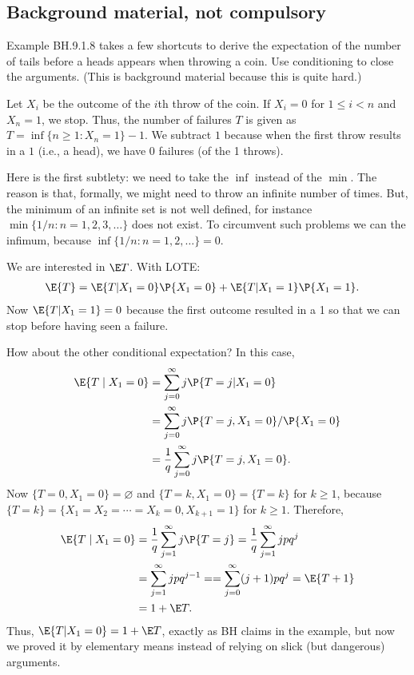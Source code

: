 \subsection{Background material, not compulsory}
\label{sec:backgr-mater-not}

\begin{exercise}
Example BH.9.1.8 takes a few shortcuts to derive the expectation of the number of tails before a heads appears when throwing a coin.
Use conditioning to close the arguments. (This is background material because this is quite hard.)
\begin{solution}
Let $X_{i}$ be the outcome of the $i$th throw of the coin.
If $X_{i}=0$ for $1\leq i< n$ and $X_{n}=1$, we stop.
Thus, the number of failures $T$ is given as $T=\inf\{n\geq 1: X_n=1\} - 1$.
We subtract $1$ because when the first throw results in a $1$ (i.e., a head), we have 0 failures (of the 1 throws).

Here is the first subtlety: we need to take the $\inf$ instead of the $\min$.
The reason is that, formally, we might need to throw an infinite number of times.
But, the minimum of an infinite set is not well defined, for instance $\min\{1/n: n=1, 2, 3, \ldots\}$ does not exist.
To circumvent such problems we can the infimum, because $\inf\{1/n : n = 1, 2, \ldots\} = 0$.

We are interested in $\E T$. With LOTE:
\begin{align*}
  \E{T}
  &= \E{T|X_1=0} \P{X_1=0} + \E{T|X_1=1} \P{X_1=1}.
\end{align*}
Now $\E{T|X_1=1} = 0$ because the first outcome resulted in a 1 so that we can stop before having seen a failure.

How about the other conditional expectation? In this case,
\begin{align*}
  \E{T\mid X_{1} = 0}
  &= \sum_{j=0}^{\infty} j \P{T=j|X_{1} = 0} \\
  &= \sum_{j=0}^{\infty} j \P{T=j, X_{1} = 0}/\P{X_{1} = 0} \\
  &= \frac{1}{q}\sum_{j=0}^{\infty} j \P{T=j, X_{1} = 0}.
\end{align*}
Now  $\{T=0, X_{1} = 0\} = \varnothing$ and  $\{T=k, X_{1} = 0\} = \{T=k\}$ for $k\geq 1$, because $\{T=k\}=\{X_{1}= X_{2} = \cdots =X_{k} = 0, X_{k+1} = 1\}$ for $k\geq 1$.
Therefore,
\begin{align*}
  \E{T\mid X_{1} = 0}
  &= \frac{1}{q}\sum_{j=1}^{\infty} j \P{T=j}
  = \frac{1}{q}\sum_{j=1}^{\infty} j pq^{j} \\
  &= \sum_{j=1}^{\infty} j pq^{j-1}  =
  = \sum_{j=0}^{\infty} (j+1) pq^{j}  = \E{T+1} \\
  &= 1  + \E T.
\end{align*}
Thus, $\E{T|X_{1} = 0} = 1 + \E T$, exactly as BH claims in the example, but now we proved it by elementary means instead of relying on slick (but dangerous) arguments.
\end{solution}
\end{exercise}


